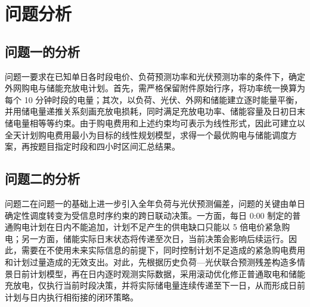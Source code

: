 \section{问题分析}

\subsection{问题一的分析}

问题一要求在已知单日各时段电价、负荷预测功率和光伏预测功率的条件下，确定外网购电与储能充放电计划。首先，需严格保留附件原始行序，将功率统一换算为每个 10 分钟时段的电量；其次，以负荷、光伏、外网和储能建立逐时能量平衡，并用储电量递推关系刻画充放电损耗，同时满足充放电功率、储能容量及日初日末储电量相等等约束。由于购电费用和上述约束均可表示为线性形式，因此可建立以全天计划购电费用最小为目标的线性规划模型，求得一个最优购电与储能调度方案，再按题目指定时段和四小时区间汇总结果。

\subsection{问题二的分析}

问题二在问题一的基础上进一步引入全年负荷与光伏预测偏差，问题的关键由单日确定性调度转变为受信息时序约束的跨日联动决策。一方面，每日 0:00 制定的普通购电计划在日内不能追加，计划不足产生的供电缺口只能以 5 倍电价紧急购电；另一方面，储能实际日末状态将传递至次日，当前决策会影响后续运行。因此，需要在不使用未来实际信息的前提下，同时控制计划不足造成的紧急购电费用和计划过量造成的无效支出。对此，先根据历史负荷—光伏联合预测残差构造多情景日前计划模型，再在日内逐时观测实际数据，采用滚动优化修正普通取电和储能充放电，仅执行当前时段决策，并将实际储电量连续传递至下一日，从而形成日前计划与日内执行相衔接的闭环策略。
